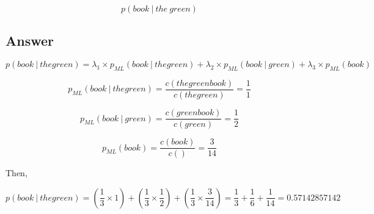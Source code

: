 \documentclass{article}
\newcommand\given[1][]{\:#1\vert\:}
\begin{document}
\begin{equation*}
p(book\given the\ green)
\end{equation*}

\subsection*{Answer}


\begin{equation*}
p(book \given the
green) = \lambda_1 \times p_{ML}(book \given the
green ) + \lambda_2 \times p_{ML}(book \given green) + \lambda_3 \times p_{ML}(book)
\end{equation*}

\begin{equation*}
 p_{ML}(book \given the
green ) = \frac{c(the
green
book)}{c(the
green)} = \frac{1}{1}
\end{equation*}

\begin{equation*}
 p_{ML}(book \given green ) = \frac{c(green
book)}{c(green)} = \frac{1}{2}
\end{equation*}

\begin{equation*}
 p_{ML}(book ) = \frac{c(book)}{c()} = \frac{3}{14}
\end{equation*}

Then,

\begin{equation*}
p(book \given the green) = (\frac{1}{3} \times 1) + (\frac{1}{3} \times \frac{1}{2}) + (\frac{1}{3} \times \frac{3}{14}) = \frac{1}{3} + \frac{1}{6} + \frac{1}{14} = 0.57142857142
\end{equation*}
\end{document}
